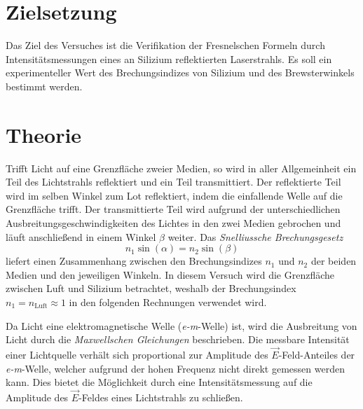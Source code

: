 \section{Zielsetzung}
\label{sec:Ziel}
Das Ziel des Versuches ist die Verifikation der Fresnelschen Formeln durch Intensitätsmessungen eines an Silizium reflektierten Laserstrahls. Es soll ein experimenteller
Wert des Brechungsindizes von Silizium und des Brewsterwinkels bestimmt werden.

\section{Theorie}
\label{sec:Theorie}
Trifft Licht auf eine Grenzfläche zweier Medien, so wird in aller Allgemeinheit ein Teil des Lichtstrahls reflektiert und ein Teil transmittiert. Der reflektierte Teil
wird im selben Winkel zum Lot reflektiert, indem die einfallende Welle auf die Grenzfläche trifft. Der transmittierte Teil wird aufgrund der unterschiedlichen 
Ausbreitungsgeschwindigkeiten des Lichtes in den zwei Medien gebrochen und läuft anschließend in einem Winkel $\beta$ weiter. Das \textit{Snelliussche Brechungsgesetz}
\begin{equation}
    \label{eqn:Snellius}
    n_{1} \sin(\alpha)=n_{2} \sin(\beta)
\end{equation}
liefert einen Zusammenhang zwischen den Brechungsindizes $n_1$ und $n_2$ der beiden Medien und den jeweiligen Winkeln.
In diesem Versuch wird die Grenzfläche zwischen Luft und Silizium betrachtet, weshalb der Brechungsindex $n_1 = n_\text{Luft} \approx 1$ in den folgenden Rechnungen
verwendet wird.

Da Licht eine elektromagnetische Welle (\textit{e-m}-Welle) ist, wird die Ausbreitung von Licht durch die \textit{Maxwellschen Gleichungen} beschrieben. Die messbare Intensität 
einer Lichtquelle verhält sich proportional zur Amplitude des $\vec{E}$-Feld-Anteiles der \textit{e-m}-Welle, welcher aufgrund der hohen Frequenz nicht direkt gemessen werden 
kann. Dies bietet die Möglichkeit durch eine Intensitätsmessung auf die Amplitude des $\vec{E}$-Feldes eines Lichtstrahls zu schließen.

